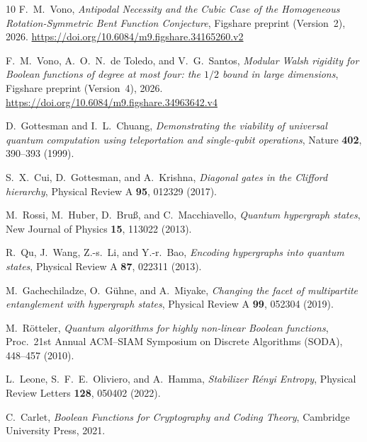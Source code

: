 \documentclass[11pt,a4paper]{article}
\begin{document}
\begin{thebibliography}{10}
F.~M.~Vono,
\emph{Antipodal Necessity and the Cubic Case of the Homogeneous Rotation-Symmetric Bent Function Conjecture},
Figshare preprint (Version~2), 2026.
\url{https://doi.org/10.6084/m9.figshare.34165260.v2}

F.~M.~Vono, A.~O.~N.~de Toledo, and V.~G.~Santos,
\emph{Modular Walsh rigidity for Boolean functions of degree at most four: the $1/2$ bound in large dimensions},
Figshare preprint (Version~4), 2026.
\url{https://doi.org/10.6084/m9.figshare.34963642.v4}

D.~Gottesman and I.~L.~Chuang,
\emph{Demonstrating the viability of universal quantum computation using teleportation and single-qubit operations},
Nature \textbf{402}, 390--393 (1999).

S.~X.~Cui, D.~Gottesman, and A.~Krishna,
\emph{Diagonal gates in the Clifford hierarchy},
Physical Review A \textbf{95}, 012329 (2017).

M.~Rossi, M.~Huber, D.~Bru\ss, and C.~Macchiavello,
\emph{Quantum hypergraph states},
New Journal of Physics \textbf{15}, 113022 (2013).

R.~Qu, J.~Wang, Z.-s.~Li, and Y.-r.~Bao,
\emph{Encoding hypergraphs into quantum states},
Physical Review A \textbf{87}, 022311 (2013).

M.~Gachechiladze, O.~G\"uhne, and A.~Miyake,
\emph{Changing the facet of multipartite entanglement with hypergraph states},
Physical Review A \textbf{99}, 052304 (2019).

M.~R\"otteler,
\emph{Quantum algorithms for highly non-linear Boolean functions},
Proc.\ 21st Annual ACM--SIAM Symposium on Discrete Algorithms (SODA), 448--457 (2010).

L.~Leone, S.~F.~E.~Oliviero, and A.~Hamma,
\emph{Stabilizer R\'enyi Entropy},
Physical Review Letters \textbf{128}, 050402 (2022).

C.~Carlet,
\emph{Boolean Functions for Cryptography and Coding Theory},
Cambridge University Press, 2021.
\end{thebibliography}
\end{document}
